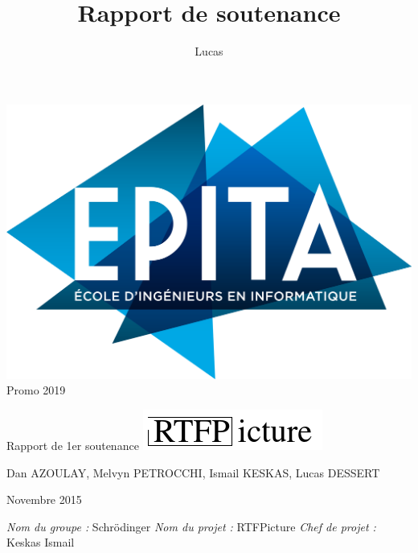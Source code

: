 \documentclass[12pt,a4paper]{article}
\author{Lucas}
\title{Rapport de soutenance}
\begin{document}


\begin{titlepage}


\flushright \includegraphics[scale=.15]{Pictures/EPITA_LOGO_DEF.png}
\flushright Promo 2019



\begin{center}

\hspace{1.5cm}
{\Huge Rapport de 1er soutenance} 
\newline
\newline
\newline
\newline
\newline
\includegraphics[scale=1]{titre1.png}
\end{center}
\begin{center}

\end{center}
\begin{Large}
\begin{center}
Dan AZOULAY, Melvyn PETROCCHI, Ismail KESKAS, Lucas DESSERT \end{center}
\end{Large}
\vspace{.5cm}
\begin{center}
\begin{large}
Novembre 2015
\end{large}
\end{center}

\noindent
\newline
\newline
\textit{Nom du groupe :} Schrödinger \newline 
\textit{Nom du projet :} RTFPicture\newline 
\textit{Chef de projet :} Keskas Ismail \newline
\end{titlepage}
\newpage
\end{document}
